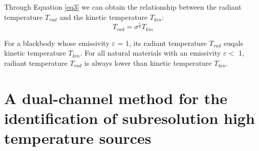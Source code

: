 \noindent Through Equation \eqref{eq3} we can obtain the relationship between the radiant temperature $T_{rad}$ and the kinetic temperature $T_{kin}$:
\begin{equation}
\label{eq4}
T_{rad} = \sigma ^{\frac{1}{4}} T_{kin}
\end{equation}

\noindent For a blackbody whose emissivity $\varepsilon$ = 1, its radiant temperature $T_{rad}$ euqals kinetic temperature $T_{kin}$. For all natural materials with an emissivity $\varepsilon <$ 1, radiant temperature $T_{rad}$ is always lower than kinetic temperature $T_{kin}$.


\section{A dual-channel method for the identification of subresolution high temperature sources}


